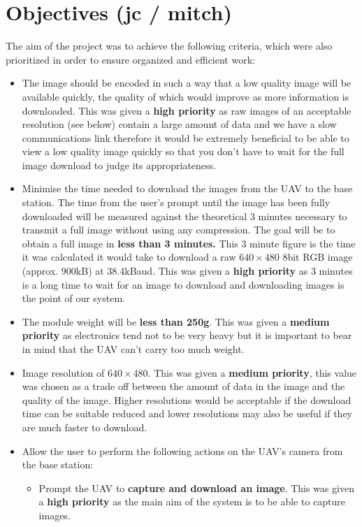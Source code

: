 \section{Objectives (jc / mitch)} 

The aim of the project was to achieve the following criteria, which were also prioritized in order to ensure organized and efficient work: 

\begin{itemize}
	\item The image should be encoded in such a way that a low quality image will be available quickly, the quality of which would improve as more information is downloaded. This was given a \textbf{high priority} as raw images of an acceptable resolution (see below) contain a large amount of data and we have a slow communications link therefore it would be extremely beneficial to be able to view a low quality image quickly so that you don't have to wait for the full image download to judge its appropriateness.
	\item Minimise the time needed to download the images from the UAV to the base station. The time from the user’s prompt until the image has been fully downloaded will be measured against the theoretical 3 minutes necessary to transmit a full image without using any compression. The goal will be to obtain a full image in \textbf{less than 3 minutes.} This 3 minute figure is the time it was calculated it would take to download a raw $640\times480$ 8bit RGB image (approx. 900kB) at 38.4kBaud. This was given a \textbf{high priority} as 3 minutes is a long time to wait for an image to download and downloading images is the point of our system.
	\item The module weight will be \textbf{less than 250g}. This was given a \textbf{medium priority} as electronics tend not to be very heavy but it is important to bear in mind that the UAV can't carry too much weight.
	\item Image resolution of \textbf{$640\times480$}. This was given a \textbf{medium priority}, this value was chosen as a trade off between the amount of data in the image and the quality of the image. Higher resolutions would be acceptable if the download time can be suitable reduced and lower resolutions may also be useful if they are much faster to download.
	\item Allow the user to perform the following actions on the UAV’s camera from the base station:
	\begin{itemize}
		\item Prompt the UAV to \textbf{capture and download an image}. This was given a \textbf{high priority} as the main aim of the system is to be able to capture images.

\end{itemize}
\end{itemize}
